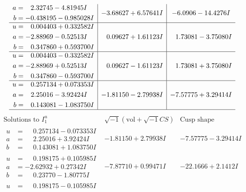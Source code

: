 \documentclass[1p]{elsarticle_modified}
\theoremstyle{definition}
\newcommand{\I}{\sqrt{-1}}
\begin{document}
$$\begin{array}{c|c|c}
\begin{aligned}
a &= \phantom{-}2.32745 - 4.81945 I \\
b &= -0.438195 - 0.985028 I\end{aligned}
 & -3.68627 + 6.57641 I & -6.0906 - 14.4276 I \\ \hline\begin{aligned}
u &= \phantom{-}0.004403 + 0.332582 I \\
a &= -2.88969 - 0.52513 I \\
b &= \phantom{-}0.347860 + 0.593700 I\end{aligned}
 & \phantom{-}0.09627 + 1.61123 I & \phantom{-}1.73081 - 3.75080 I \\ \hline\begin{aligned}
u &= \phantom{-}0.004403 - 0.332582 I \\
a &= -2.88969 + 0.52513 I \\
b &= \phantom{-}0.347860 - 0.593700 I\end{aligned}
 & \phantom{-}0.09627 - 1.61123 I & \phantom{-}1.73081 + 3.75080 I \\ \hline\begin{aligned}
u &= \phantom{-}0.257134 + 0.073353 I \\
a &= \phantom{-}2.25016 - 3.92424 I \\
b &= \phantom{-}0.143081 - 1.083750 I\end{aligned}
 & -1.81150 - 2.79938 I & -7.57775 + 3.29414 I\\
 \hline 
 \end{array}$$\newpage$$\begin{array}{c|c|c}  
\text{Solutions to }I^u_{1}& \I (\text{vol} + \sqrt{-1}CS) & \text{Cusp shape}\\
 \hline 
\begin{aligned}
u &= \phantom{-}0.257134 - 0.073353 I \\
a &= \phantom{-}2.25016 + 3.92424 I \\
b &= \phantom{-}0.143081 + 1.083750 I\end{aligned}
 & -1.81150 + 2.79938 I & -7.57775 - 3.29414 I \\ \hline\begin{aligned}
u &= \phantom{-}0.198175 + 0.105985 I \\
a &= -2.62932 + 0.27342 I \\
b &= \phantom{-}0.23770 - 1.80775 I\end{aligned}
 & -7.87710 + 0.99471 I & -22.1666 + 2.1412 I \\ \hline\begin{aligned}
u &= \phantom{-}0.198175 - 0.105985 I \\

\end{aligned}
\end{array}$$
\end{document}
